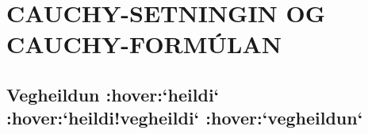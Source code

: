 \newenvironment{se}{\begin{setning+}\sl}{\hfill$\square$\end{setning+}\rm}
\newenvironment{sex}{\begin{setning+}\sl}{\hfill$\blacksquare$\end{setning+}\rm}
\newenvironment{sk}{\begin{skilgreining+}\rm}{\hfill$\square$\end{skilgreining+}\rm}
\newenvironment{sesk}{\begin{setningogskilgreining+}\rm}{\hfill$\square$\end{setningogskilgreining+}\rm}
\newenvironment{hs}{\begin{hjalparsetning+}\sl}{\hfill$\square$\end{hjalparsetning+}\rm}
\newenvironment{fs}{\begin{fylgisetning+}\sl}{\hfill$\square$\end{fylgisetning+}\rm}
\newenvironment{sy}{\begin{synidaemi+}\rm}{\hfill$\square$\end{synidaemi+}\rm}
\newenvironment{fo}{\begin{forrit+}\rm}{\hfill\end{forrit+}\rm}
\newenvironment{so}{\medbreak\noindent{\it Sönnun:}\rm}{\hfill$\blacksquare$\rm}
\newenvironment{sotx}[1]{\medbreak\noindent{\it #1:}\rm}{\hfill$\blacksquare$\rm}
\newcommand{\aefing}{\section{Æfingardæmi} \setcounter{daemateljari}{1}}
\newcommand{\daemi}{
{\medskip\noindent{\bf \thedaemateljari.}}
\addtocounter{daemateljari}{1}
}

\def\svar#1{\smallskip\noindent{\bf #1.} \ }
\def\lausn#1{\smallskip\noindent{\bf #1.} \ }
\def\ugrein#1{\medbreak\noindent{\bf #1.} }
\newcommand{\samantekt}{\noindent{\bf Samantekt.} }

\chapter {CAUCHY-SETNINGIN OG CAUCHY-FORMÚLAN}
 

\section
{Vegheildun :hover:`heildi` :hover:`heildi!vegheildi` :hover:`vegheildun`}

